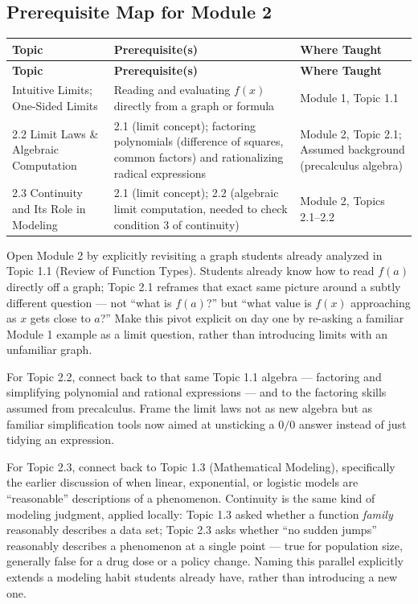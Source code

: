 \documentclass[11pt]{article}
\begin{document}
\subsection*{Prerequisite Map for Module 2}
\begin{longtable}{p{4.3cm} p{6.2cm} p{4cm}}
\toprule
\textbf{Topic} & \textbf{Prerequisite(s)} & \textbf{Where Taught} \\
\midrule
\endfirsthead
\toprule
\textbf{Topic} & \textbf{Prerequisite(s)} & \textbf{Where Taught} \\
\midrule
\endhead
\bottomrule
\endfoot
2.1 Intuitive Limits; One-Sided Limits & Reading and evaluating $f(x)$ directly from a graph or formula & Module 1, Topic 1.1 \\
2.2 Limit Laws \& Algebraic Computation & 2.1 (limit concept); factoring polynomials (difference of squares, common factors) and rationalizing radical expressions & Module 2, Topic 2.1; Assumed background (precalculus algebra) \\
2.3 Continuity and Its Role in Modeling & 2.1 (limit concept); 2.2 (algebraic limit computation, needed to check condition 3 of continuity) & Module 2, Topics 2.1--2.2 \\
\end{longtable}

\begin{bridgebox}
Open Module 2 by explicitly revisiting a graph students already analyzed in Topic 1.1 (Review of Function Types). Students already know how to read $f(a)$ directly off a graph; Topic 2.1 reframes that exact same picture around a subtly different question --- not ``what is $f(a)$?'' but ``what value is $f(x)$ approaching as $x$ gets close to $a$?'' Make this pivot explicit on day one by re-asking a familiar Module 1 example as a limit question, rather than introducing limits with an unfamiliar graph.

For Topic 2.2, connect back to that same Topic 1.1 algebra --- factoring and simplifying polynomial and rational expressions --- and to the factoring skills assumed from precalculus. Frame the limit laws not as new algebra but as familiar simplification tools now aimed at unsticking a $0/0$ answer instead of just tidying an expression.

For Topic 2.3, connect back to Topic 1.3 (Mathematical Modeling), specifically the earlier discussion of when linear, exponential, or logistic models are ``reasonable'' descriptions of a phenomenon. Continuity is the same kind of modeling judgment, applied locally: Topic 1.3 asked whether a function \emph{family} reasonably describes a data set; Topic 2.3 asks whether ``no sudden jumps'' reasonably describes a phenomenon at a single point --- true for population size, generally false for a drug dose or a policy change. Naming this parallel explicitly extends a modeling habit students already have, rather than introducing a new one.
\end{bridgebox}
\end{document}
